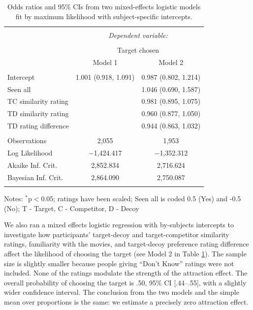 \documentclass[12pt, a4paper]{article}
\begin{document}
\begin{table}[htb!]
\centering
  \begin{threeparttable}
    \caption{Odds ratios and 95\% CIs from two mixed-effects logistic models fit by maximum likelihood with subject-specific intercepts.}
  \label{latentattr_exp2reg}
\begin{tabular}{@{\extracolsep{5pt}}lcc}
\\[-1.8ex]\hline
\hline \\[-1.8ex]
 & \multicolumn{2}{c}{\textit{Dependent variable:}} \\
\cline{2-3}
\\[-1.8ex] & \multicolumn{2}{c}{Target chosen} \\
 & Model 1 & Model 2 \\
\hline \\[-1.8ex]
 Intercept & 1.001 (0.918, 1.091) & 0.987 (0.802, 1.214) \\
  Seen all &  & 1.046 (0.690, 1.587) \\
  TC similarity rating &  & 0.981 (0.895, 1.075) \\
  TD similarity rating &  & 0.960 (0.877, 1.050) \\
  TD rating difference &  & 0.944 (0.863, 1.032) \\
 \hline \\[-1.8ex]
Observations & 2,055 & 1,953 \\
Log Likelihood & $-$1,424.417 & $-$1,352.312 \\
Akaike Inf. Crit. & 2,852.834 & 2,716.624 \\
Bayesian Inf. Crit. & 2,864.090 & 2,750.087 \\
\hline
\hline \\[-1.8ex]
\end{tabular}
    \begin{tablenotes}
      \small
      \item Notes: $^{*}$p$<$0.05; ratings have been scaled; Seen all is coded 0.5 (Yes) and -0.5 (No); T - Target, C - Competitor, D - Decoy
    \end{tablenotes}
  \end{threeparttable}
\end{table}

We also ran a mixed effects logistic regression with by-subjects intercepts to investigate how participants' target-decoy and target-competitor similarity ratings, familiarity with the movies, and target-decoy preference rating difference affect the likelihood of choosing the target (see Model 2 in Table \ref{latentattr_exp2reg}). The sample size is slightly smaller because people giving ``Don't Know'' ratings were not included. None of the ratings modulate the strength of the attraction effect. The overall probability of choosing the target is .50, 95\% CI [.44--.55], with a slightly wider confidence interval. The conclusion from the two models and the simple mean over proportions is the same: we estimate a precisely zero attraction effect.
\end{document}
